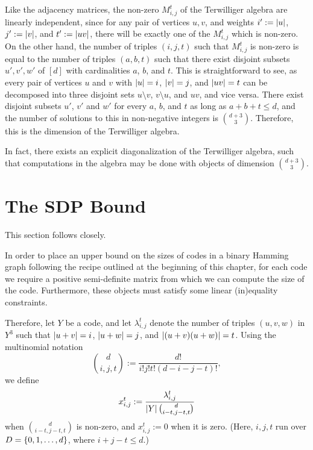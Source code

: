 \documentclass{report}
\newcommand{\wt}[1]{\abs{ #1 }}
\newcommand{\lijt}{\lambda_{i, j}^t}
\newcommand{\xijt}{x_{i, j}^t}
\newcommand{\Mijt}{M_{i, j}^t}
\begin{document}
    Like the adjacency matrices, the non-zero $\Mijt$ of the Terwilliger algebra
    are linearly independent, since for any pair of vertices $u, v$, and weights
    $i' := \wt{u}$, $j' := \wt{v}$, and $t' := \wt{uv}$, there will be exactly
    one of the $\Mijt$ which is non-zero.  On the other hand, the number of
    triples $(i, j, t)$ such that $\Mijt$ is non-zero is equal to the number of
    triples $(a, b, t)$ such that there exist disjoint subsets $u', v', w'$ of
    $[d]$ with cardinalities $a$, $b$, and $t$.  This is straightforward to see,
    as every pair of vertices $u$ and $v$ with $\wt{u} = i$, $\wt{v} = j$, and
    $\wt{uv} = t$ can be decomposed into three disjoint sets $u \setminus v$, $v
    \setminus u$, and $uv$, and vice versa.  There exist disjoint subsets $u'$,
    $v'$ and $w'$ for every $a$, $b$, and $t$ as long as $a + b + t \leq d$, and
    the number of solutions to this in non-negative integers is
    $\binom{d+3}{3}$.  Therefore, this is the dimension of the Terwilliger
    algebra.

    In fact, there exists an explicit diagonalization of the Terwilliger
    algebra, such that computations in the algebra may be done with objects of
    dimension $\binom{d+3}{3}$.

  \FloatBarrier
  \section{The SDP Bound}\label{sec:SDP-bound:SDP-bound}

    This section follows \cite[Subsection I. B]{schrijver} closely.

    In order to place an upper bound on the sizes of codes in a binary Hamming
    graph following the recipe outlined at the beginning of this chapter, for
    each code we require a positive semi-definite matrix from which we can
    compute the size of the code.  Furthermore, these objects must satisfy some
    linear (in)equality constraints.

    Therefore, let $Y$ be a code, and let $\lijt$ denote the number of triples
    $(u, v, w)$ in $Y^3$ such that $\wt{u + v} = i$, $\wt{u + w} = j$, and
    $\wt{(u+v)(u+w)} = t$.  Using the multinomial notation
    $$
      \binom{d}{i, j, t} := \frac{d!}{i! j! t! (d - i - j - t)!},
    $$
    we define
    \begin{equation}
      \xijt := \frac{\lijt}{\abs{Y} \binom{d}{i - t, j - t, t}}
    \end{equation}
    when $\binom{d}{i-t, j-t, t}$ is non-zero, and $\xijt := 0$ when it is zero.
    (Here, $i, j, t$ run over $D = \left\lbrace 0, 1, \ldots, d \right\rbrace$, where $i + j - t \leq
    d$.)
\end{document}

